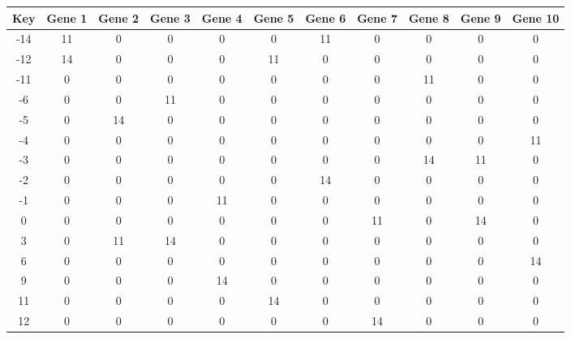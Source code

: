 \begin{tabular}{|c|c|c|c|c|c|c|c|c|c|c|}
\hline
Key & Gene 1 & Gene 2 & Gene 3 & Gene 4 & Gene 5 & Gene 6 & Gene 7 & Gene 8 & Gene 9 & Gene 10 \\
\hline
-14 & 11 & 0 & 0 & 0 & 0 & 11 & 0 & 0 & 0 & 0 \\
-12 & 14 & 0 & 0 & 0 & 11 & 0 & 0 & 0 & 0 & 0 \\
-11 & 0 & 0 & 0 & 0 & 0 & 0 & 0 & 11 & 0 & 0 \\
-6 & 0 & 0 & 11 & 0 & 0 & 0 & 0 & 0 & 0 & 0 \\
-5 & 0 & 14 & 0 & 0 & 0 & 0 & 0 & 0 & 0 & 0 \\
-4 & 0 & 0 & 0 & 0 & 0 & 0 & 0 & 0 & 0 & 11 \\
-3 & 0 & 0 & 0 & 0 & 0 & 0 & 0 & 14 & 11 & 0 \\
-2 & 0 & 0 & 0 & 0 & 0 & 14 & 0 & 0 & 0 & 0 \\
-1 & 0 & 0 & 0 & 11 & 0 & 0 & 0 & 0 & 0 & 0 \\
0 & 0 & 0 & 0 & 0 & 0 & 0 & 11 & 0 & 14 & 0 \\
3 & 0 & 11 & 14 & 0 & 0 & 0 & 0 & 0 & 0 & 0 \\
6 & 0 & 0 & 0 & 0 & 0 & 0 & 0 & 0 & 0 & 14 \\
9 & 0 & 0 & 0 & 14 & 0 & 0 & 0 & 0 & 0 & 0 \\
11 & 0 & 0 & 0 & 0 & 14 & 0 & 0 & 0 & 0 & 0 \\
12 & 0 & 0 & 0 & 0 & 0 & 0 & 14 & 0 & 0 & 0 \\
\hline
\end{tabular}
